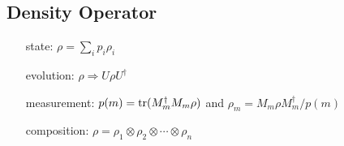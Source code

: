 \subsection*{Density Operator}
\begin{itemize}
\item [state:] $\rho = \sum_i p_i\rho_i$
\item [evolution:] $\rho \Rightarrow U\rho U^\dagger$
\item [measurement:] $p(m) = \trace(M^\dagger_m M_m\rho)$ and
  $\rho_m = M_m\rho M^\dagger_m / p(m)$
\item [composition:] $\rho = \rho_1\otimes \rho_2\otimes \dotsm \otimes\rho_n$
\end{itemize}